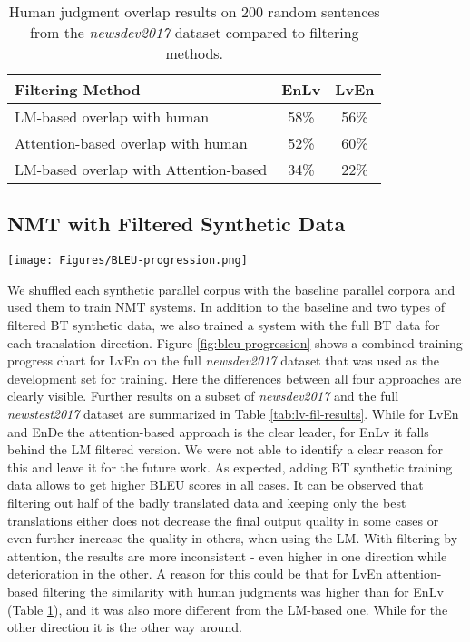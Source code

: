 \documentclass[]{article}
\begin{document}
\begin{table}[h]
  \begin{center}
    \begin{tabular}{|l|c|c|}
      \hline 
      Filtering Method & EnLv & LvEn\\ 
      \hline 
      LM-based overlap with human 				& 58\% & 56\% \\
      Attention-based overlap with human 		& 52\% & 60\% \\
      \hline
      LM-based overlap with Attention-based 	& 34\% & 22\% \\
      \hline
    \end{tabular}
  \end{center}
  \caption{Human judgment overlap results on 200 random sentences from the \textit{newsdev2017} dataset compared to filtering methods.}
  \label{tab:human-fil-results}
\end{table}

\subsection{NMT with Filtered Synthetic Data}

\begin{figure*}[h]
  \texttt{[image: Figures/BLEU-progression.png]}
  \caption{Automatic evaluation progression of LvEn experiments on validation data. Orange -- baseline; dark blue –- with full back-translated data; green -- with LM-filtered back-translated data; light blue -- with attention-filtered back-translated data.}
  \label{fig:bleu-progression}
\end{figure*}

We shuffled each synthetic parallel corpus with the baseline parallel corpora and used them to train NMT systems. In addition to the baseline and two types of filtered BT synthetic data, we also trained a system with the full BT data for each translation direction. Figure \ref{fig:bleu-progression} shows a combined training progress chart for LvEn on the full \textit{newsdev2017} dataset that was used as the development set for training. Here the differences between all four approaches are clearly visible. Further results on a subset of \textit{newsdev2017} and the full \textit{newstest2017} dataset are summarized in Table \ref{tab:lv-fil-results}. While for LvEn and EnDe the attention-based approach is the clear leader, for EnLv it falls behind the LM filtered version. We were not able to identify a clear reason for this and leave it for the future work. As expected, adding BT synthetic training data allows to get higher BLEU scores in all cases. It can be observed that filtering out half of the badly translated data and keeping only the best translations either does not decrease the final output quality in some cases or even further increase the quality in others, when using the LM. With filtering by attention, the results are more inconsistent - even higher in one direction while deterioration in the other. A reason for this could be that for LvEn attention-based filtering the similarity with human judgments was higher than for EnLv (Table \ref{tab:human-fil-results}), and it was also more different from the LM-based one. While for the other direction it is the other way around. 
\end{document}
